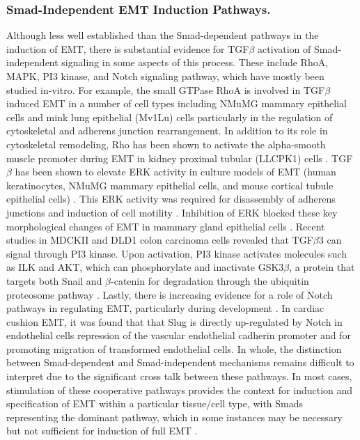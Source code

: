 \subsubsection*{Smad-Independent EMT Induction Pathways. }Although less well established than the Smad-dependent pathways in the induction of EMT, there is substantial evidence for TGF$\beta$ activation of Smad-independent signaling in some aspects of this process.
These include RhoA, MAPK, PI3 kinase, and Notch signaling pathway, which have mostly been studied in-vitro.
For example, the small GTPase RhoA is involved in TGF$\beta$ induced EMT in a number of cell types including NMuMG mammary epithelial cells and mink lung epithelial (Mv1Lu) cells particularly in the regulation of cytoskeletal and adherens junction rearrangement.
In addition to its role in cytoskeletal remodeling, Rho has been shown to activate the alpha-smooth muscle promoter during EMT in kidney proximal tubular (LLCPK1) cells \cite{Masszi:2003hb}.
TGF$\beta$ has been shown to elevate ERK activity in culture models of EMT (human keratinocytes, NMuMG mammary epithelial cells, and mouse cortical tubule epithelial cells) \cite{Zavadil2001,Xie2004,Davies2005}.
This ERK activity was required for disassembly of adherens junctions and induction of cell motility \cite{Xie2004}.
Inhibition of ERK blocked these key morphological changes of EMT in mammary gland epithelial cells \cite{Xie2003}.
Recent studies in MDCKII and DLD1 colon carcinoma cells revealed that TGF$\beta$3 can signal through PI3 kinase.
Upon activation, PI3 kinase activates molecules such as ILK and AKT, which can phosphorylate and inactivate GSK3$\beta$, a protein that targets both Snail and $\beta$-catenin for degradation through the ubiquitin proteosome pathway \cite{Medici:2008fk}.
Lastly, there is increasing evidence for a role of Notch pathways in regulating EMT, particularly during development \cite{Nawshad:2005pi}.
In cardiac cushion EMT, it was found that that Slug is directly up-regulated by Notch in endothelial cells repression of the vascular endothelial cadherin promoter and for promoting migration of transformed endothelial cells.
In whole, the distinction between Smad-dependent and Smad-independent mechanisms remains difficult to interpret due to the significant cross talk between these pathways.
In most cases, stimulation of these cooperative pathways provides the context for induction and specification of EMT within a particular tissue/cell type, with Smads representing the dominant pathway, which in some instances may be necessary but not sufficient for induction of full EMT \cite{Zavadil:2005fu}.

